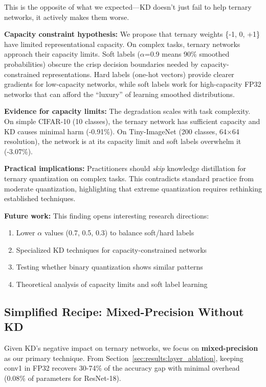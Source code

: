 This is the opposite of what we expected—KD doesn't just fail to help ternary networks, it actively makes them worse.

\textbf{Capacity constraint hypothesis:} We propose that ternary weights \{-1, 0, +1\} have limited representational capacity. On complex tasks, ternary networks approach their capacity limits. Soft labels ($\alpha$=0.9 means 90\% smoothed probabilities) obscure the crisp decision boundaries needed by capacity-constrained representations. Hard labels (one-hot vectors) provide clearer gradients for low-capacity networks, while soft labels work for high-capacity FP32 networks that can afford the ``luxury'' of learning smoothed distributions.

\textbf{Evidence for capacity limits:} The degradation scales with task complexity. On simple CIFAR-10 (10 classes), the ternary network has sufficient capacity and KD causes minimal harm (-0.91\%). On Tiny-ImageNet (200 classes, 64×64 resolution), the network is at its capacity limit and soft labels overwhelm it (-3.07\%).

\textbf{Practical implications:} Practitioners should \textit{skip} knowledge distillation for ternary quantization on complex tasks. This contradicts standard practice from moderate quantization, highlighting that extreme quantization requires rethinking established techniques.

\textbf{Future work:} This finding opens interesting research directions:
\begin{enumerate}
    \item Lower $\alpha$ values (0.7, 0.5, 0.3) to balance soft/hard labels
    \item Specialized KD techniques for capacity-constrained networks
    \item Testing whether binary quantization shows similar patterns
    \item Theoretical analysis of capacity limits and soft label learning
\end{enumerate}

\subsection{Simplified Recipe: Mixed-Precision Without KD}
\label{sec:results:recipe}

Given KD's negative impact on ternary networks, we focus on \textbf{mixed-precision} as our primary technique. From Section~\ref{sec:results:layer_ablation}, keeping conv1 in FP32 recovers 30-74\% of the accuracy gap with minimal overhead (0.08\% of parameters for ResNet-18).


